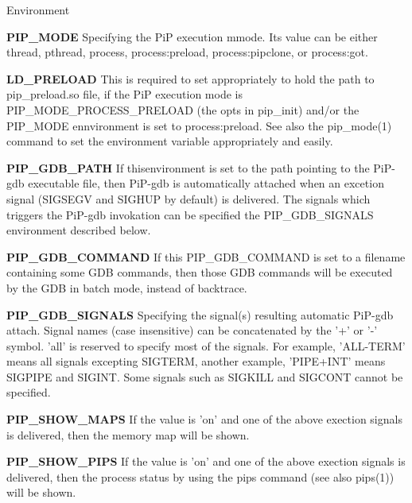 \begin{DoxyParagraph}{Environment}
\begin{DoxyItemize}
\item {\bfseries P\-I\-P\-\_\-\-M\-O\-D\-E} Specifying the Pi\-P execution mmode. Its value can be either {\ttfamily thread}, {\ttfamily pthread}, {\ttfamily process}, {\ttfamily process\-:preload}, {\ttfamily process\-:pipclone}, or {\ttfamily process\-:got}. \item {\bfseries L\-D\-\_\-\-P\-R\-E\-L\-O\-A\-D} This is required to set appropriately to hold the path to {\ttfamily pip\-\_\-preload.\-so} file, if the Pi\-P execution mode is {\ttfamily P\-I\-P\-\_\-\-M\-O\-D\-E\-\_\-\-P\-R\-O\-C\-E\-S\-S\-\_\-\-P\-R\-E\-L\-O\-A\-D} (the {\ttfamily opts} in {\ttfamily pip\-\_\-init}) and/or the P\-I\-P\-\_\-\-M\-O\-D\-E ennvironment is set to {\ttfamily process\-:preload}. See also the pip\-\_\-mode(1) command to set the environment variable appropriately and easily. \item {\bfseries P\-I\-P\-\_\-\-G\-D\-B\-\_\-\-P\-A\-T\-H} If thisenvironment is set to the path pointing to the Pi\-P-\/gdb executable file, then Pi\-P-\/gdb is automatically attached when an excetion signal (S\-I\-G\-S\-E\-G\-V and S\-I\-G\-H\-U\-P by default) is delivered. The signals which triggers the Pi\-P-\/gdb invokation can be specified the {\ttfamily P\-I\-P\-\_\-\-G\-D\-B\-\_\-\-S\-I\-G\-N\-A\-L\-S} environment described below. \item {\bfseries P\-I\-P\-\_\-\-G\-D\-B\-\_\-\-C\-O\-M\-M\-A\-N\-D} If this P\-I\-P\-\_\-\-G\-D\-B\-\_\-\-C\-O\-M\-M\-A\-N\-D is set to a filename containing some G\-D\-B commands, then those G\-D\-B commands will be executed by the G\-D\-B in batch mode, instead of backtrace. \item {\bfseries P\-I\-P\-\_\-\-G\-D\-B\-\_\-\-S\-I\-G\-N\-A\-L\-S} Specifying the signal(s) resulting automatic Pi\-P-\/gdb attach. Signal names (case insensitive) can be concatenated by the '+' or '-\/' symbol. 'all' is reserved to specify most of the signals. For example, 'A\-L\-L-\/\-T\-E\-R\-M' means all signals excepting {\ttfamily S\-I\-G\-T\-E\-R\-M}, another example, 'P\-I\-P\-E+\-I\-N\-T' means {\ttfamily S\-I\-G\-P\-I\-P\-E} and {\ttfamily S\-I\-G\-I\-N\-T}. Some signals such as S\-I\-G\-K\-I\-L\-L and S\-I\-G\-C\-O\-N\-T cannot be specified. \item {\bfseries P\-I\-P\-\_\-\-S\-H\-O\-W\-\_\-\-M\-A\-P\-S} If the value is 'on' and one of the above exection signals is delivered, then the memory map will be shown. \item {\bfseries P\-I\-P\-\_\-\-S\-H\-O\-W\-\_\-\-P\-I\-P\-S} If the value is 'on' and one of the above exection signals is delivered, then the process status by using the {\ttfamily pips} command (see also pips(1)) will be shown.\end{DoxyItemize}

\end{DoxyParagraph}
